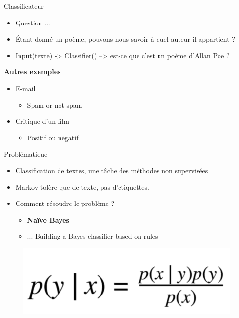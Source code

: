 \documentclass[aspectratio=169,xcolor=dvipsnames, t]{beamer}
\begin{document}
\begin{frame}{Classificateur}
	\begin{itemize}
		\item Question ... 
		\item Étant donné un poème, pouvons-nous savoir à quel auteur il appartient ?
		\item Input(texte) -> Classifier() --> est-ce que c'est un poème d'Allan Poe ?
	\end{itemize}

	\vspace{0.5cm}
	
	\textbf{Autres exemples}	
	\begin{itemize}
		\item E-mail
		\begin{itemize}
			\item Spam or not spam
		\end{itemize}
		\item Critique d'un film
		\begin{itemize}
			\item Positif ou négatif 
		\end{itemize}
	\end{itemize}
	
\end{frame}

\begin{frame}{Problématique}
	\begin{itemize}
		\item Classification de textes, une tâche des méthodes non supervisées
		\item Markov tolère que de texte, pas d’étiquettes.
		\item Comment résoudre le problème ?
			\begin{itemize}
				\item \textbf{Naïve Bayes}
				\item ... Building a Bayes classifier based on rules
			\end{itemize}
	\end{itemize}
	
	\begin{figure}
		\includegraphics[height=0.25\paperheight]{figures/eq1.png}
	\end{figure}
	
\end{frame}
\end{document}
